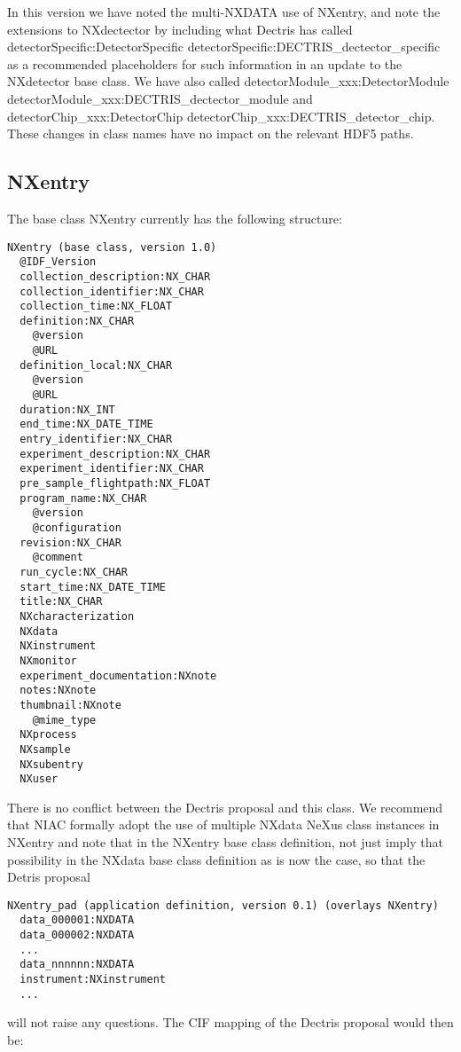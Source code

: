 \documentclass[11pt]{article}
\begin{document}
{{In this version we have noted the multi-NXDATA use of
NXentry, and note the extensions to NXdectector by including what
Dectris has called detectorSpecific:DetectorSpecific
detectorSpecific:DECTRIS\_dectector\_specific
as a recommended placeholders for such information in an
update to the NXdetector base class.   We have also called
detectorModule\_xxx:DetectorModule detectorModule\_xxx:DECTRIS\_dectector\_module
and detectorChip\_xxx:DetectorChip detectorChip\_xxx:DECTRIS\_detector\_chip.
These changes in class names have no impact on the relevant HDF5 paths.


\subsection{NXentry}

The base class NXentry currently has the following structure:

\begin{verbatim}
NXentry (base class, version 1.0)
  @IDF_Version
  collection_description:NX_CHAR
  collection_identifier:NX_CHAR
  collection_time:NX_FLOAT
  definition:NX_CHAR
    @version
    @URL
  definition_local:NX_CHAR
    @version
    @URL
  duration:NX_INT
  end_time:NX_DATE_TIME
  entry_identifier:NX_CHAR
  experiment_description:NX_CHAR
  experiment_identifier:NX_CHAR
  pre_sample_flightpath:NX_FLOAT
  program_name:NX_CHAR
    @version
    @configuration
  revision:NX_CHAR
    @comment
  run_cycle:NX_CHAR
  start_time:NX_DATE_TIME
  title:NX_CHAR
  NXcharacterization
  NXdata
  NXinstrument
  NXmonitor
  experiment_documentation:NXnote
  notes:NXnote
  thumbnail:NXnote
    @mime_type
  NXprocess
  NXsample
  NXsubentry
  NXuser
\end{verbatim}

There is no conflict between the Dectris proposal and this class.  We recommend
that NIAC formally adopt the use of multiple NXdata NeXus class instances
in NXentry and note that in the NXentry base class definition, not just imply that
possibility in the NXdata base class definition as is now the case, so that the
Detris proposal

\begin{verbatim}
NXentry_pad (application definition, version 0.1) (overlays NXentry)
  data_000001:NXDATA
  data_000002:NXDATA
  ...
  data_nnnnnn:NXDATA
  instrument:NXinstrument
  ...
\end{verbatim}

will not raise any questions.  The CIF mapping of the Dectris proposal
would then be:

}}
\end{document}
